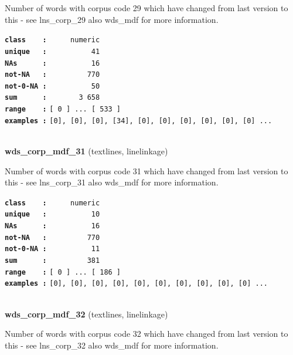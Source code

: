 \documentclass[]{article}
\begin{document}
Number of words with corpus code 29 which have changed from last version
to this - see lns\_corp\_29 also wds\_mdf for more information.

\textbf{\texttt{class\ \ \ \ :}} \texttt{~~~~~numeric}\\
\textbf{\texttt{unique\ \ \ :}} \texttt{~~~~~~~~~~41}\\
\textbf{\texttt{NAs\ \ \ \ \ \ :}} \texttt{~~~~~~~~~~16}\\
\textbf{\texttt{not-NA\ \ \ :}} \texttt{~~~~~~~~~770}\\
\textbf{\texttt{not-0-NA\ :}} \texttt{~~~~~~~~~~50}\\
\textbf{\texttt{sum\ \ \ \ \ \ :}} \texttt{~~~~~~~3~658}\\
\textbf{\texttt{range\ \ \ \ :}}
\texttt{{[}\ 0\ {]}\ ...\ {[}\ 533\ {]}}\\
\textbf{\texttt{examples\ :}}
\texttt{{[}0{]},\ {[}0{]},\ {[}0{]},\ {[}34{]},\ {[}0{]},\ {[}0{]},\ {[}0{]},\ {[}0{]},\ {[}0{]},\ {[}0{]}\ ...}\\

~

\textbf{wds\_corp\_mdf\_31} (textlines, linelinkage)

Number of words with corpus code 31 which have changed from last version
to this - see lns\_corp\_31 also wds\_mdf for more information.

\textbf{\texttt{class\ \ \ \ :}} \texttt{~~~~~numeric}\\
\textbf{\texttt{unique\ \ \ :}} \texttt{~~~~~~~~~~10}\\
\textbf{\texttt{NAs\ \ \ \ \ \ :}} \texttt{~~~~~~~~~~16}\\
\textbf{\texttt{not-NA\ \ \ :}} \texttt{~~~~~~~~~770}\\
\textbf{\texttt{not-0-NA\ :}} \texttt{~~~~~~~~~~11}\\
\textbf{\texttt{sum\ \ \ \ \ \ :}} \texttt{~~~~~~~~~381}\\
\textbf{\texttt{range\ \ \ \ :}}
\texttt{{[}\ 0\ {]}\ ...\ {[}\ 186\ {]}}\\
\textbf{\texttt{examples\ :}}
\texttt{{[}0{]},\ {[}0{]},\ {[}0{]},\ {[}0{]},\ {[}0{]},\ {[}0{]},\ {[}0{]},\ {[}0{]},\ {[}0{]},\ {[}0{]}\ ...}\\

~

\textbf{wds\_corp\_mdf\_32} (textlines, linelinkage)

Number of words with corpus code 32 which have changed from last version
to this - see lns\_corp\_32 also wds\_mdf for more information.
\end{document}
